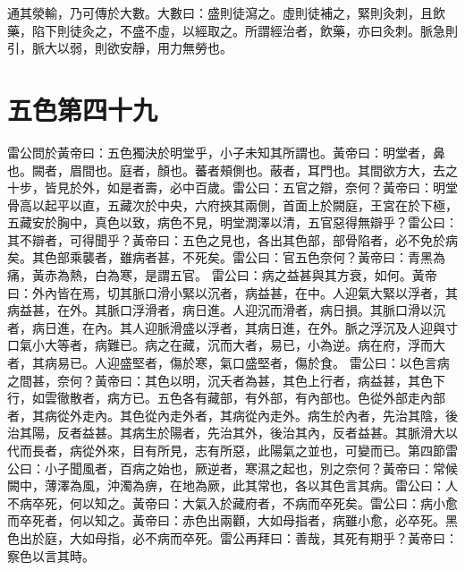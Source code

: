 通其滎輸，乃可傳於大數。大數曰：盛則徒瀉之。虛則徒補之，緊則灸刺，且飲藥，陷下則徒灸之，不盛不虛，以經取之。所謂經治者，飲藥，亦曰灸刺。脈急則引，脈大以弱，則欲安靜，用力無勞也。



\section{五色第四十九}

雷公問於黃帝曰：五色獨決於明堂乎，小子未知其所謂也。黃帝曰：明堂者，鼻也。闕者，眉間也。庭者，顏也。蕃者頰側也。蔽者，耳門也。其間欲方大，去之十步，皆見於外，如是者壽，必中百歲。雷公曰：五官之辯，奈何？黃帝曰：明堂骨高以起平以直，五藏次於中央，六府挾其兩側，首面上於闕庭，王宮在於下極，五藏安於胸中，真色以致，病色不見，明堂潤澤以清，五官惡得無辯乎？雷公曰：其不辯者，可得聞乎？黃帝曰：五色之見也，各出其色部，部骨陷者，必不免於病矣。其色部乘襲者，雖病者甚，不死矣。雷公曰：官五色奈何？黃帝曰：青黑為痛，黃赤為熱，白為寒，是謂五官。
雷公曰：病之益甚與其方衰，如何。黃帝曰：外內皆在焉，切其脈口滑小緊以沉者，病益甚，在中。人迎氣大緊以浮者，其病益甚，在外。其脈口浮滑者，病日進。人迎沉而滑者，病日損。其脈口滑以沉者，病日進，在內。其人迎脈滑盛以浮者，其病日進，在外。脈之浮沉及人迎與寸口氣小大等者，病難已。病之在藏，沉而大者，易已，小為逆。病在府，浮而大者，其病易已。人迎盛堅者，傷於寒，氣口盛堅者，傷於食。
雷公曰：以色言病之間甚，奈何？黃帝曰：其色以明，沉夭者為甚，其色上行者，病益甚，其色下行，如雲徹散者，病方已。五色各有藏部，有外部，有內部也。色從外部走內部者，其病從外走內。其色從內走外者，其病從內走外。病生於內者，先治其陰，後治其陽，反者益甚。其病生於陽者，先治其外，後治其內，反者益甚。其脈滑大以代而長者，病從外來，目有所見，志有所惡，此陽氣之並也，可變而已。第四節雷公曰：小子聞風者，百病之始也，厥逆者，寒濕之起也，別之奈何？黃帝曰：常候闕中，薄澤為風，沖濁為痹，在地為厥，此其常也，各以其色言其病。雷公曰：人不病卒死，何以知之。黃帝曰：大氣入於藏府者，不病而卒死矣。雷公曰：病小愈而卒死者，何以知之。黃帝曰：赤色出兩顴，大如母指者，病雖小愈，必卒死。黑色出於庭，大如母指，必不病而卒死。雷公再拜曰：善哉，其死有期乎？黃帝曰：察色以言其時。

